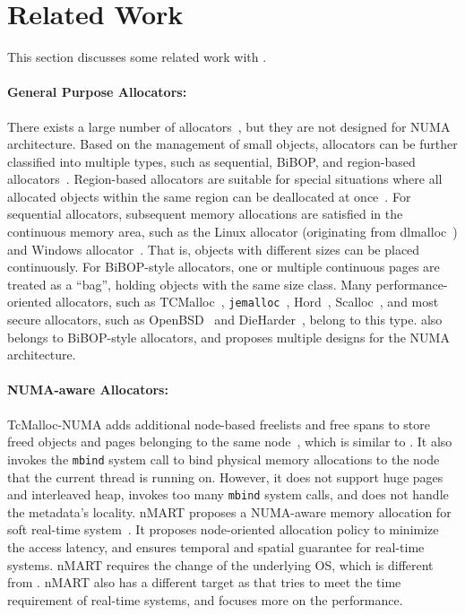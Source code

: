 \section{Related Work}

\label{sec:related}

This section discusses some related work with \NM{}. 

\paragraph{General Purpose Allocators:}
 There exists a large number of allocators~\cite{dlmalloc,Hoard,tcmalloc,jemalloc,Scalloc}, but they are not designed for NUMA architecture. Based on the management of small objects, allocators can be further classified into multiple types, such as sequential, BiBOP, and region-based allocators~\cite{DieHarder, Gay:1998:MME:277650.277748}. Region-based allocators are suitable for special situations where all allocated objects within the same region can be deallocated at once~\cite{Gay:1998:MME:277650.277748}. For sequential allocators, subsequent memory allocations are satisfied in the continuous memory area, such as the Linux allocator (originating from dlmalloc~\cite{dlmalloc}) and Windows allocator~\cite{DieHarder}. That is, objects with different sizes can be placed continuously. For BiBOP-style allocators, one or multiple continuous pages are treated as a ``bag'', holding objects with the same size class. Many performance-oriented allocators, such as TCMalloc~\cite{tcmalloc}, \texttt{jemalloc}~\cite{jemalloc}, Hord~\cite{Hoard}, Scalloc~\cite{Scalloc}, and most secure allocators, such as OpenBSD~\cite{OpenBSD} and DieHarder~\cite{DieHarder}, belong to this type.  \NM{} also belongs to BiBOP-style allocators, and proposes multiple designs for the NUMA architecture. 

\paragraph{NUMA-aware Allocators:} TcMalloc-NUMA adds additional node-based freelists and free spans to store freed objects and pages belonging to the same node~\cite{tcmallocnew}, which is similar to \NM{}. It also invokes the \texttt{mbind} system call to bind physical memory allocations to the node that the current thread is running on. However, it does not support huge pages and interleaved heap, invokes too many \texttt{mbind} system calls, and does not handle the metadata's locality. nMART proposes a NUMA-aware memory allocation for soft real-time system~\cite{kim2013node}. It proposes node-oriented allocation policy to minimize the access latency, and ensures temporal and spatial guarantee for real-time systems. nMART requires the change of the underlying OS, which is different from \NM{}. nMART also has a different target as \NM{} that tries to meet the time requirement of real-time systems, and \NM{} focuses more on the performance.

